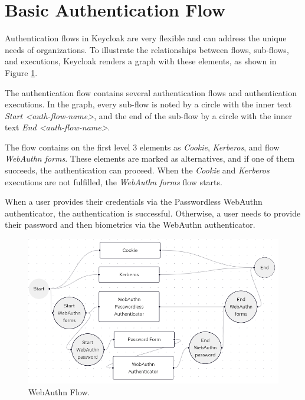 \section{Basic Authentication Flow}
Authentication flows in Keycloak are very flexible and can address the unique needs of organizations.
To illustrate the relationships between flows, sub-flows, and executions, Keycloak renders a graph with these elements, as shown in Figure \ref{fig:basic-auth-flow}.

The authentication flow contains several authentication flows and authentication executions.
In the graph, every sub-flow is noted by a circle with the inner text \textit{Start <auth-flow-name>}, and the end of the sub-flow by a circle with the inner text \textit{End <auth-flow-name>}.

The flow contains on the first level 3 elements as \textit{Cookie}, \textit{Kerberos}, and flow \textit{WebAuthn forms}.
These elements are marked as alternatives, and if one of them succeeds, the authentication can proceed.
When the \textit{Cookie} and \textit{Kerberos} executions are not fulfilled, the \textit{WebAuthn forms} flow starts.

When a user provides their credentials via the Passwordless WebAuthn authenticator, the authentication is successful.
Otherwise, a user needs to provide their password and then biometrics via the WebAuthn authenticator.
\newpage

\begin{figure}[htbp]
  \centering
  \includegraphics[width=1\textwidth]{img/flow-new.png}
  \caption{WebAuthn Flow.}
  \label{fig:basic-auth-flow}
\end{figure}

\newpage